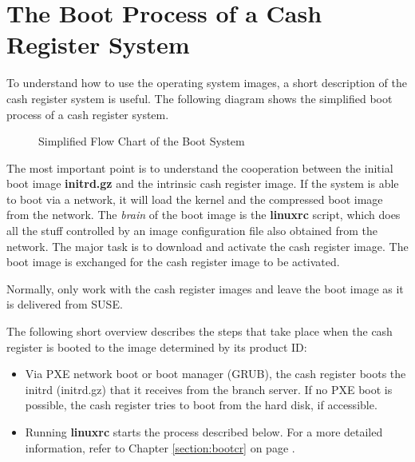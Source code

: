 \chapter{The Boot Process of a Cash Register System}
\label{CRbootprocess}
To understand how to use the operating system images, a short
description of the cash register system is useful. The
following diagram shows the simplified boot process of a
cash register system.

\begin{figure}[h]
\centering
\caption{Simplified Flow Chart of the Boot System}
\end{figure}

The most important point is to understand the cooperation between
the initial boot image \textbf{initrd.gz} and the intrinsic cash register
image. If the system is able to boot via a network, it will load the kernel
and the compressed boot image from the network. The \textit{brain} of the
boot image is the \textbf{linuxrc} script, which does all the
stuff controlled by an image configuration file also obtained from the
network. The major task is to download and activate the cash register
image. The boot image is exchanged for the cash register image to be
activated.

Normally, only work with the cash register images and leave
the boot image as it is delivered from SUSE.


The following short overview describes the steps that take place when the cash register
is booted to the image determined by its product ID:

\begin{itemize}
\item Via PXE network boot or boot manager (GRUB), the cash register boots the
      initrd (initrd.gz) that it receives from the branch server. If no PXE
      boot is possible, the cash register tries to boot from the hard
      disk, if accessible.  
\item Running \textbf{linuxrc} starts the process described below.
      For a more detailed information, refer to Chapter \ref{section:bootcr}
      on page \pageref{section:bootcr}.
\end{itemize}

